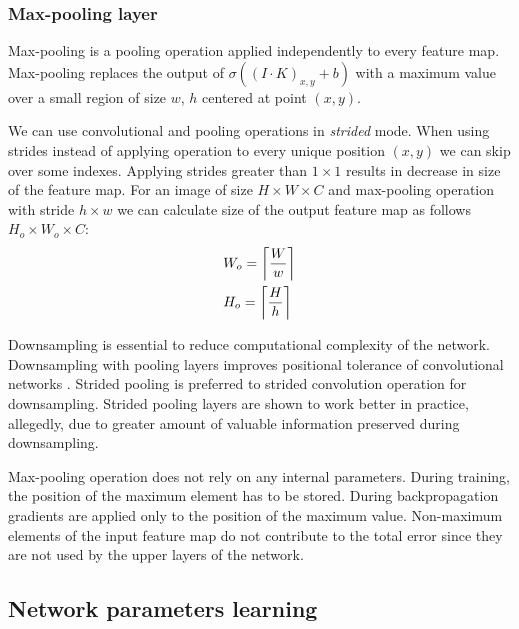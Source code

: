 \subsubsection{Max-pooling layer}

Max-pooling is a pooling operation applied independently to every feature map.
Max-pooling replaces the output of $\sigma((I \cdot K)_{x, y}+b)$ with a maximum value over a small region of size $w$, $h$ centered at point $(x,y)$.

We can use convolutional and pooling operations in \textit{strided} mode. When using strides instead of applying operation to every unique position $(x, y)$ we can skip over some indexes. Applying strides greater than $1 \times 1$ results in decrease in size of the feature map. For an image of size $H \times W \times C$ and max-pooling operation with stride $h \times w$ we can calculate size of the output feature map as follows $H_o \times W_o \times C $:
\begin{equation*}
  \begin{aligned}
  & W_o = \ceil[\bigg]{\frac{W}{w}} \\
  & H_o = \ceil[\bigg]{\frac{H}{h}} \\
\end{aligned}
\end{equation*}

Downsampling is essential to reduce computational complexity of the network.
Downsampling with pooling layers improves positional tolerance of convolutional networks \cite{Scherer2010}.
Strided pooling is preferred to strided convolution operation for downsampling. Strided pooling layers are shown to work better in practice, allegedly, due to greater amount of valuable information preserved during downsampling.

Max-pooling operation does not rely on any internal parameters. During training, the position of the maximum element has to be stored. During backpropagation gradients are applied only to the position of the maximum value. Non-maximum elements of the input feature map do not contribute to the total error since they are not used by the upper layers of the network.

\subsection{Network parameters learning}
\label{ch:opt}


